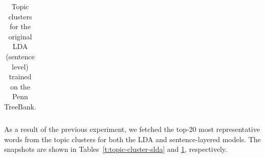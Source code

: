 \begin{table}[!ht]
\begin{tabular}{llllllllll}
  \end{tabular}
  \caption{Topic clusters for the original LDA (sentence level) trained on the Penn TreeBank.}
  \label{t:topic-cluster-lda}
\end{table}

As a result of the previous experiment, we fetched the top-20 most
representative words from the topic clusters for both the LDA and
sentence-layered models.  The snapshots are shown in
Tables~\ref{t:topic-cluster-slda} and \ref{t:topic-cluster-lda}, respectively.



% 
% 
% 

